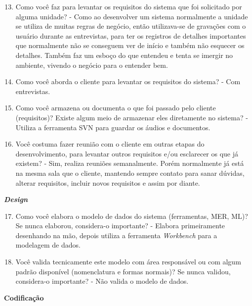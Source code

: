 \begin{anexosenv}
\begin{enumerate}
\setcounter{enumi}{12}
\item Como você faz para levantar os requisitos do sistema que foi solicitado por alguma
unidade?\newline
- Como ao desenvolver um sistema normalmente a unidade se utiliza de muitas regras de negócio, então utilizava-se de gravações com o usuário durante as entrevistas, para ter os registros de detalhes importantes que normalmente não se conseguem ver de início e também não esquecer os detalhes. Também faz um esboço do que entendeu e tenta se imergir no ambiente, vivendo o negócio para o entender bem.
\item Como você aborda o cliente para levantar os requisitos do sistema?\newline
- Com entrevistas.
\item Como você armazena ou documenta o que foi passado pelo cliente (requisitos)? Existe
algum meio de armazenar eles diretamente no sistema?\newline
- Utiliza a ferramenta SVN para guardar os áudios e documentos.
\item Você costuma fazer reunião com o cliente em outras etapas do desenvolvimento, para
levantar outros requisitos e/ou esclarecer os que já existem?\newline
- Sim, realiza reuniões semanalmente. Porém normalmente já está na mesma sala que o cliente, mantendo sempre contato para sanar dúvidas, alterar requisitos, incluir novos requisitos e assim por diante.
\end{enumerate}

\textbf{\textit{Design}}

\begin{enumerate}
\setcounter{enumi}{16}
\item Como você elabora o modelo de dados do sistema (ferramentas, MER, ML)? Se nunca
elaborou, considera-o importante?\newline
- Elabora primeiramente desenhando na mão, depois utiliza a ferramenta \textit{Workbench} para a modelagem de dados.
\item Você valida tecnicamente este modelo com área responsável ou com algum padrão
disponível (nomenclatura e formas normais)? Se nunca validou, considera-o importante?\newline
- Não valida o modelo de dados.
\end{enumerate}

\textbf{Codificação}


\end{anexosenv}
